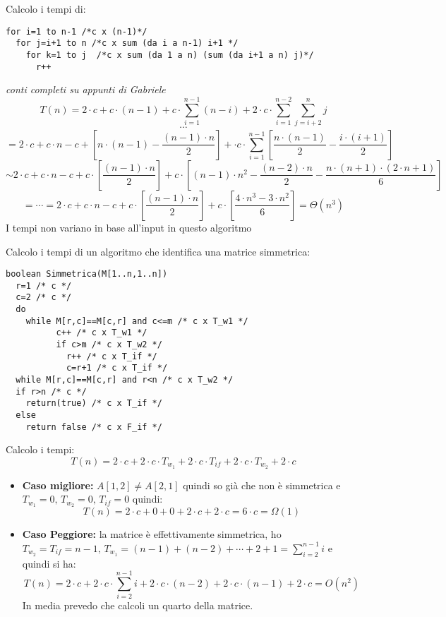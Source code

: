 \documentclass[a4paper,12pt,oneside,tikz]{book}
\begin{document}
\begin{esercizio}
Calcolo i tempi di:
\begin{verbatim}
for i=1 to n-1 /*c x (n-1)*/
  for j=i+1 to n /*c x sum (da i a n-1) i+1 */
    for k=1 to j  /*c x sum (da 1 a n) (sum (da i+1 a n) j)*/
      r++
\end{verbatim}
\textit{conti completi su appunti di Gabriele}
$$T(n)=2\cdot c +c\cdot (n-1)+c\cdot \sum_{i=1}^{n-1}(n-i)+2\cdot c\cdot \sum_{i=1}^{n-2}\sum_{j=i+2}^{n}j$$
$$\cdots$$
$$=2\cdot c+c\cdot n -c +\left[ n\cdot (n-1)-\frac{(n-1)\cdot n}{2}\right]+\cdot c\cdot \sum_{i=1}^{n-1}\left[ \frac{n\cdot(n-1)}{2}-\frac{i\cdot(i+1)}{2} \right]$$
$$\sim 2\cdot c +c\cdot n-c +c\cdot\left[ \frac{(n-1)\cdot n}{2}\right]+c\cdot\left[ (n-1)\cdot n^2-\frac{(n-2)\cdot n}{2}-\frac{n\cdot (n+1)\cdot (2\cdot n+1)}{6}\right]$$
$$=\cdots=2\cdot c +c\cdot n-c+c\cdot\left[ \frac{(n-1)\cdot n}{2}\right]+c\cdot\left[\frac{4\cdot n^3-3\cdot n^2}{6}\right]=\Theta(n^3)$$
I tempi non variano in base all'input in questo algoritmo
\end{esercizio}
\newpage
\begin{esercizio}
Calcolo i tempi di un algoritmo che identifica una matrice simmetrica:
\begin{verbatim}
boolean Simmetrica(M[1..n,1..n])
  r=1 /* c */
  c=2 /* c */
  do
    while M[r,c]==M[c,r] and c<=m /* c x T_w1 */
    	  c++ /* c x T_w1 */
    	  if c>m /* c x T_w2 */
    	    r++ /* c x T_if */
    	    c=r+1 /* c x T_if */
  while M[r,c]==M[c,r] and r<n /* c x T_w2 */
  if r>n /* c */
    return(true) /* c x T_if */
  else 
    return false /* c x F_if */
\end{verbatim}
Calcolo i tempi:
$$T(n)=2\cdot c + 2\cdot c\cdot T_{w_1}+2\cdot c\cdot T_{if}+2\cdot c\cdot T_{w_2} +2\cdot c$$
\begin{itemize}
\item \textbf{Caso migliore:} $A[1,2]\neq A[2,1]$ quindi so già che non è simmetrica e $T_{w_1}=0,\,T_{w_2}=0,\, T_{if}=0$ quindi: $$T(n)=2\cdot c +0+0+2\cdot c+2\cdot c= 6\cdot c=\Omega(1) $$
\item \textbf{Caso Peggiore:} la matrice è effettivamente simmetrica, ho $T_{w_2}=T_{if}=n-1,\, T_{w_1}=(n-1)+(n-2)+\cdots+2+1=\sum_{i=2}^{n-1}i$ e quindi si ha: $$T(n)=2\cdot c + 2\cdot c\cdot \sum_{i=2}^{n-1}i +2\cdot c\cdot (n-2)+2\cdot c\cdot (n-1)+ 2\cdot c=O(n^2)$$
In media prevedo che calcoli un quarto della matrice.
\end{itemize}
\end{esercizio}
\end{document}
